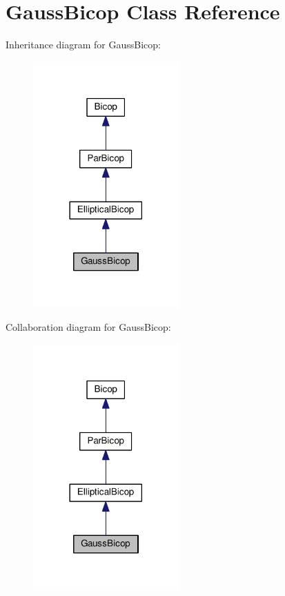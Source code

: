 \hypertarget{class_gauss_bicop}{}\section{Gauss\+Bicop Class Reference}
\label{class_gauss_bicop}


Inheritance diagram for Gauss\+Bicop\+:\nopagebreak
\begin{figure}[H]
\begin{center}
\leavevmode
\includegraphics[width=158pt]{class_gauss_bicop__inherit__graph}
\end{center}
\end{figure}


Collaboration diagram for Gauss\+Bicop\+:\nopagebreak
\begin{figure}[H]
\begin{center}
\leavevmode
\includegraphics[width=158pt]{class_gauss_bicop__coll__graph}
\end{center}
\end{figure}
